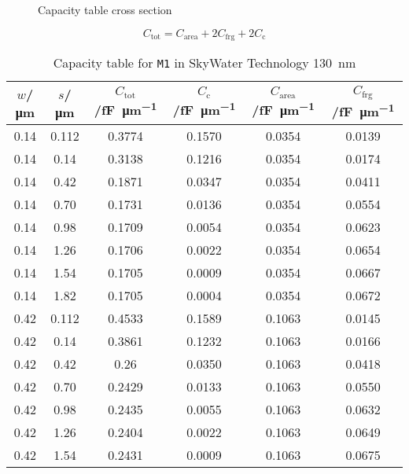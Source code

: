 \documentclass{article}[11pt]
\begin{document}
\notetitle

\begin{figure}[h]
  \centering
  \begin{tikzpicture}
    
  \end{tikzpicture}
  \caption{Capacity table cross section}
  \label{fig:cross-section}
\end{figure}

\begin{equation}
  C_{\mathrm{tot}} = C_{\mathrm{area}} + 2 C_{\mathrm{frg}} + 2 C_{\mathrm{c}}
\end{equation}

\begin{table}[h]
\centering
\caption{Capacity table for \texttt{M1} in SkyWater Technology \SI{130}{\nano\meter}\cite{sky130-pdk}}
\begin{tabular}{cc|cccc}
\toprule
$w$/\si{\micro\meter} & $s$/\si{\micro\meter}  & $C_{\mathrm{tot}}$/\si{\femto\farad\per\micro\meter}  & $C_{\mathrm{c}}$/\si{\femto\farad\per\micro\meter} & $C_{\mathrm{area}}$/\si{\femto\farad\per\micro\meter} & $C_{\mathrm{frg}}$/\si{\femto\farad\per\micro\meter} \\ \midrule
0.14 & 0.112 & 0.3774 & 0.1570 & 0.0354 & 0.0139 \\
0.14 & 0.14 & 0.3138 & 0.1216 & 0.0354 & 0.0174 \\
0.14 & 0.42 & 0.1871 & 0.0347 & 0.0354 & 0.0411 \\
0.14 & 0.70 & 0.1731 & 0.0136 & 0.0354 & 0.0554 \\
0.14 & 0.98 & 0.1709 & 0.0054 & 0.0354 & 0.0623 \\
0.14 & 1.26 & 0.1706 & 0.0022 & 0.0354 & 0.0654 \\
0.14 & 1.54 & 0.1705 & 0.0009 & 0.0354 & 0.0667 \\
0.14 & 1.82 & 0.1705 & 0.0004 & 0.0354 & 0.0672 \\
0.42 & 0.112 & 0.4533 & 0.1589 & 0.1063 & 0.0145 \\
0.42 & 0.14 & 0.3861 & 0.1232 & 0.1063 & 0.0166 \\
0.42 & 0.42 & 0.26 & 0.0350 & 0.1063 & 0.0418 \\
0.42 & 0.70 & 0.2429 & 0.0133 & 0.1063 & 0.0550 \\
0.42 & 0.98 & 0.2435 & 0.0055 & 0.1063 & 0.0632 \\
0.42 & 1.26 & 0.2404 & 0.0022 & 0.1063 & 0.0649 \\
0.42 & 1.54 & 0.2431 & 0.0009 & 0.1063 & 0.0675 \\

\end{tabular}
\end{table}
\end{document}
